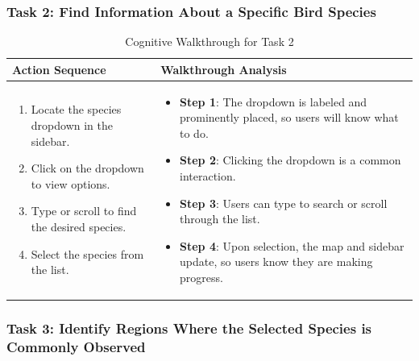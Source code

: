 \subsubsection{Task 2: Find Information About a Specific Bird Species}

\begin{table}[H]
    \centering
    \begin{tabular}{p{} | p{}}
        \hline
        \textbf{Action Sequence} & \textbf{Walkthrough Analysis} \\
        \hline
        \begin{enumerate}
            \item Locate the species dropdown in the sidebar.
            \item Click on the dropdown to view options.
            \item Type or scroll to find the desired species.
            \item Select the species from the list.
        \end{enumerate} &
        \begin{itemize}
            \item \textbf{Step 1}: The dropdown is labeled and prominently placed, so users will know what to do.
            \item \textbf{Step 2}: Clicking the dropdown is a common interaction.
            \item \textbf{Step 3}: Users can type to search or scroll through the list.
            \item \textbf{Step 4}: Upon selection, the map and sidebar update, so users know they are making progress.
        \end{itemize} \\
        \hline
    \end{tabular}
    \caption{Cognitive Walkthrough for Task 2}
    \label{tab:task2_walkthrough}
\end{table}

\subsubsection{Task 3: Identify Regions Where the Selected Species is Commonly Observed}

